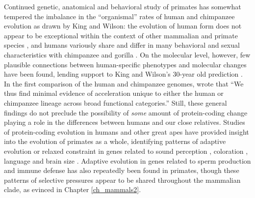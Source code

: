 Continued genetic, anatomical and behavioral study of primates has
somewhat tempered the imbalance in the ``organismal'' rates of human
and chimpanzee evolution as drawn by King and Wilson: the evolution of
human form does not appear to be exceptional within the context of
other mammalian and primate species \citep{Carroll2003}, and humans
variously share and differ in many behavioral and sexual
characteristics with chimpanzee and gorilla
\citep{Harcourt1980,Goodall1986,Vigilant2004}. On the molecular level,
however, few plausible connections between human-specific phenotypes
and molecular changes have been found, lending support to King and
Wilson's 30-year old prediction
\citep{Clark2003,Sequencing2005a,Bradley2008}. In the first comparison
of the human and chimpanzee genomes, \citet{Sequencing2005a} wrote
that ``We thus find minimal evidence of acceleration unique to either
the human or chimpanzee lineage across broad functional categories.''
Still, these general findings do not preclude the possibility of
\emph{some} amount of protein-coding change playing a role in the
differences between humans and our close relatives. Studies of
protein-coding evolution in humans and other great apes have provided
insight into the evolution of primates as a whole, identifying
patterns of adaptive evolution or relaxed constraint in genes related
to sound perception \citep{Clark2003}, coloration \citep{Mundy2007},
language \citep{Enard2002} and brain size
\citep{Montgomery2011}. Adaptive evolution in genes related to sperm
production \citep{Clark2005} and immune defense \citep{Sawyer2005a}
has also repeatedly been found in primates, though these patterns of
selective pressures appear to be shared throughout the mammalian
clade, as evinced in Chapter \ref{ch_mammals2}.

